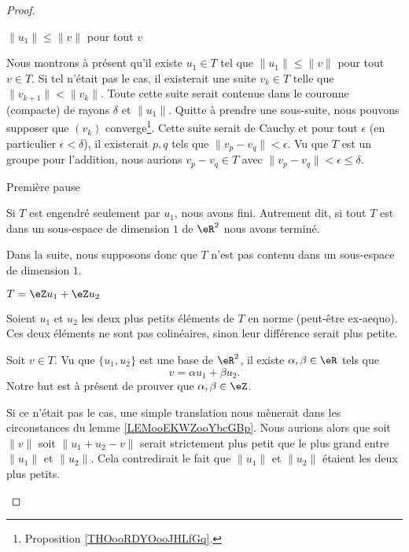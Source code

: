 \begin{proof}
\begin{subproof}
        \item[\( \| u_1 \|\leq \| v \|\) pour tout \( v\)]

            Nous montrons à présent qu'il existe \( u_1\in T\) tel que \( \| u_1 \|\leq \| v \|\) pour tout \( v\in T\). Si tel n'était pas le cas, il existerait une suite \( v_k\in T\) telle que \( \| v_{k+1} \|<\| v_k \|\). Toute cette suite serait contenue dans le couronne (compacte) de rayons \( \delta\) et \( \| u_1 \|\). Quitte à prendre une sous-suite, nous pouvons supposer que \( (v_k)\) converge\footnote{Proposition \ref{THOooRDYOooJHLfGq}.}. Cette suite serait de Cauchy et pour tout \( \epsilon\) (en particulier \( \epsilon<\delta\)), il existerait \( p,q\) tels que \( \| v_p-v_q \|<\epsilon\). Vu que \( T\) est un groupe pour l'addition, nous aurions \( v_p-v_q\in T\) avec \( \| v_p-v_q \|<\epsilon\leq \delta\).

        \item[Première pause]

            Si \( T\) est engendré seulement par \( u_1\), nous avons fini. Autrement dit, si tout \( T\) est dans un sous-espace de dimension \( 1\) de \( \eR^2\) nous avons terminé.

            Dans la suite, nous supposons donc que \( T\) n'est pas contenu dans un sous-espace de dimension \( 1\).

        \item[\( T=\eZ u_1 + \eZ u_2\)]

            Soient \( u_1\) et \( u_2\) les deux plus petits éléments de \( T\) en norme (peut-être ex-aequo). Ces deux éléments ne sont pas colinéaires, sinon leur différence serait plus petite.

            Soit \( v\in T\). Vu que \( \{ u_1,u_2 \}\) est une base de \( \eR^2\), il existe \( \alpha,\beta\in \eR\) tels que
            \begin{equation}
                v=\alpha u_1+\beta u_2.
            \end{equation}
            Notre but est à présent de prouver que \( \alpha,\beta\in \eZ\).

            Si ce n'était pas le cas, une simple translation nous mènerait dans les circonstances du lemme \ref{LEMooEKWZooYbcGBp}. Nous aurions alors que soit \( \| v \|\) soit \(\| u_1+u_2-v \|\) serait strictement plus petit que le plus grand entre \( \| u_1 \|\) et \( \| u_2 \|\). Cela contredirait le fait que \( \| u_1 \|\) et \( \| u_2 \|\) étaient les deux plus petits.
    \end{subproof}
\end{proof}

